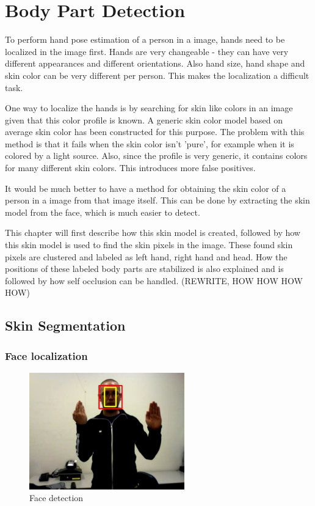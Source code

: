 
\chapter{Body Part Detection}
\label{ch:bodyparts}

To perform hand pose estimation of a person in a image, hands need to be localized in the image first. Hands are very changeable - they can have very different appearances and different orientations. Also hand size, hand shape and skin color can be very different per person. This makes the localization a  difficult task. 

One way to localize the hands is by searching for skin like colors in an image given that this color profile is known. A generic skin color model based on average skin color has been constructed for this purpose\cite{Jones1999}. The problem with this method is that it fails when the skin color isn't 'pure', for example when it is colored by a light source. Also, since the profile is very generic, it contains colors for many different skin colors. This introduces more false positives.

It would be much better to have a method for obtaining the skin color of a person in a image from that image itself. This can be done by extracting the skin model from the face, which is much easier to detect.

This chapter will first describe how this skin model is created, followed by how this skin model is used to find the skin pixels in the image. These found skin pixels are clustered and labeled as left hand, right hand and head. How the positions of these labeled body parts are stabilized is also explained and is followed by how self occlusion can be handled. (REWRITE, HOW HOW HOW HOW)

\section{Skin Segmentation}
\label{sec:skinmodel}

\subsection*{Face localization}

\begin{figure}
  \center{}
    \includegraphics[width=0.6\textwidth]{figures/pipeline/detected.jpg}
  \caption{Face detection}
  \label{fig:face_detection}
\end{figure}


